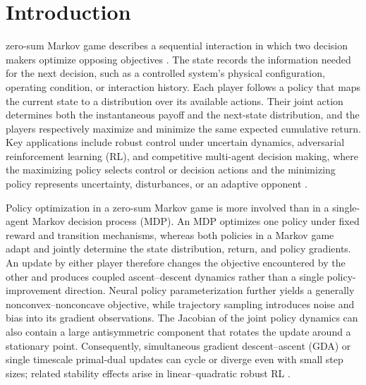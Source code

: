 \documentclass[journal]{IEEEtran}
\theoremstyle{remark}
\begin{document}
	\section{Introduction}\label{sec:intro}
	 zero-sum Markov game describes a sequential interaction in which two decision makers optimize opposing objectives \cite{Shapley1953StochasticGames,Littman1994MarkovGames}.
	The state records the information needed for the next decision, such as a controlled system's physical configuration, operating condition, or interaction history.
	Each player follows a policy that maps the current state to a distribution over its available actions.
	Their joint action determines both the instantaneous payoff and the next-state distribution, and the players respectively maximize and minimize the same expected cumulative return.
	Key applications include robust control under uncertain dynamics, adversarial reinforcement learning (RL), and competitive multi-agent decision making, where the maximizing policy selects control or decision actions and the minimizing policy represents uncertainty, disturbances, or an adaptive opponent \cite{SuttonBarto2018,MorimotoDoya2005RobustRL,Iyengar2005RobustDP,NilimElGhaoui2005,Pinto2017RARL,Kamalaruban2020LangevinRARL}.
	
	Policy optimization in a zero-sum Markov game is more involved than in a single-agent Markov decision process (MDP).
	An MDP optimizes one policy under fixed reward and transition mechanisms, whereas both policies in a Markov game adapt and jointly determine the state distribution, return, and policy gradients.
	An update by either player therefore changes the objective encountered by the other and produces coupled ascent--descent dynamics rather than a single policy-improvement direction.
	Neural policy parameterization further yields a generally nonconvex--nonconcave objective, while trajectory sampling introduces noise and bias into its gradient observations.
	The Jacobian of the joint policy dynamics can also contain a large antisymmetric component that rotates the update around a stationary point.
	Consequently, simultaneous gradient descent--ascent (GDA) or single timescale primal-dual updates can cycle or diverge even with small step sizes; related stability effects arise in linear--quadratic robust RL \cite{ZhangHuBasar2020StabilityRARL}.
	
\end{document}
